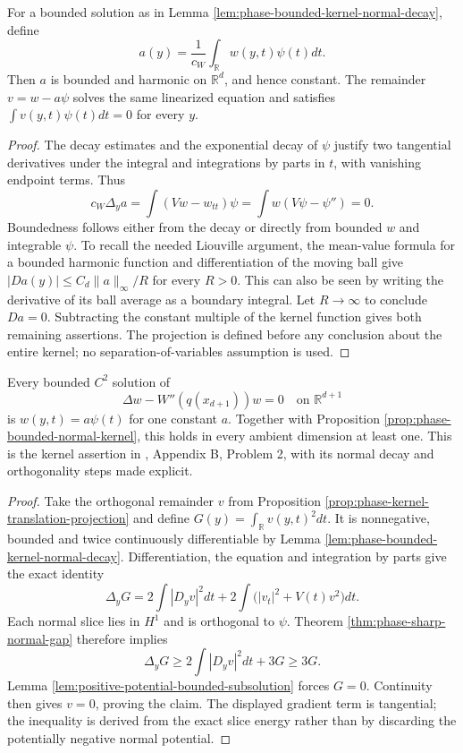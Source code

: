 \begin{proposition}\label{prop:phase-kernel-translation-projection}
For a bounded solution as in Lemma \ref{lem:phase-bounded-kernel-normal-decay}, define
\[
 a(y)=\frac1{c_W}\int_{\mathbb R}w(y,t)\psi(t)dt.
\]
Then $a$ is bounded and harmonic on $\mathbb R^d$, and hence constant. The remainder $v=w-a\psi$ solves the same linearized equation and satisfies $\int v(y,t)\psi(t)dt=0$ for every $y$.
\end{proposition}
\begin{proof}
The decay estimates and the exponential decay of $\psi$ justify two tangential derivatives under the integral and integrations by parts in $t$, with vanishing endpoint terms. Thus
\[
 c_W\Delta_y a=\int(Vw-w_{tt})\psi
 =\int w(V\psi-\psi'')=0.
\]
Boundedness follows either from the decay or directly from bounded $w$ and integrable $\psi$. To recall the needed Liouville argument, the mean-value formula for a bounded harmonic function and differentiation of the moving ball give
$|D a(y)|\leq C_d\|a\|_\infty/R$ for every $R>0$. This can also be seen by writing the derivative of its ball average as a boundary integral. Let $R\to\infty$ to conclude $Da=0$. Subtracting the constant multiple of the kernel function gives both remaining assertions. The projection is defined before any conclusion about the entire kernel; no separation-of-variables assumption is used.
\end{proof}

\begin{theorem}\label{thm:phase-flat-bounded-kernel}
Every bounded $C^2$ solution of
\[
 \Delta w-W''(q(x_{d+1}))w=0
 \quad\text{on }\mathbb R^{d+1}
\]
is $w(y,t)=a\psi(t)$ for one constant $a$. Together with Proposition \ref{prop:phase-bounded-normal-kernel}, this holds in every ambient dimension at least one. This is the kernel assertion in \cite{ChAC}, Appendix B, Problem 2, with its normal decay and orthogonality steps made explicit.
\end{theorem}
\begin{proof}
Take the orthogonal remainder $v$ from Proposition \ref{prop:phase-kernel-translation-projection} and define
$G(y)=\int_{\mathbb R}v(y,t)^2dt$.
It is nonnegative, bounded and twice continuously differentiable by Lemma \ref{lem:phase-bounded-kernel-normal-decay}. Differentiation, the equation and integration by parts give the exact identity
\[
 \Delta_yG=2\int|D_yv|^2dt+
 2\int\bigl(|v_t|^2+V(t)v^2\bigr)dt.
\]
Each normal slice lies in $H^1$ and is orthogonal to $\psi$. Theorem \ref{thm:phase-sharp-normal-gap} therefore implies
\[
 \Delta_yG\geq2\int|D_yv|^2dt+3G\geq3G.
\]
Lemma \ref{lem:positive-potential-bounded-subsolution} forces $G=0$. Continuity then gives $v=0$, proving the claim. The displayed gradient term is tangential; the inequality is derived from the exact slice energy rather than by discarding the potentially negative normal potential.
\end{proof}

